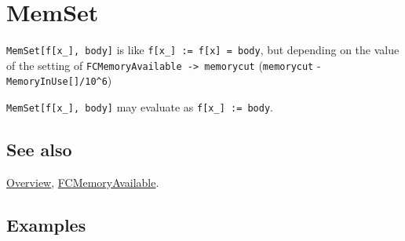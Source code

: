 \documentclass[../FeynCalcManual.tex]{subfiles}
\begin{document}
\hypertarget{memset}{%
\section{MemSet}\label{memset}}

\texttt{MemSet[\allowbreak{}f[\allowbreak{}x_],\ \allowbreak{}body]} is
like \texttt{f[\allowbreak{}x_] := f[\allowbreak{}x] = body}, but
depending on the value of the setting of
\texttt{FCMemoryAvailable -> memorycut} (\texttt{memorycut} -
\texttt{MemoryInUse[\allowbreak{}]/10^6})

\texttt{MemSet[\allowbreak{}f[\allowbreak{}x_],\ \allowbreak{}body]} may
evaluate as \texttt{f[\allowbreak{}x_] := body}.

\subsection{See also}

\hyperlink{toc}{Overview},
\hyperlink{fcmemoryavailable}{FCMemoryAvailable}.

\subsection{Examples}
\end{document}
